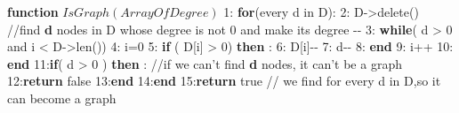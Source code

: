 \documentclass[10pt]{article}
\begin{document}
\noindent{}\textbf{function} $IsGraph(Array Of Degree)$\mdbr
{}1:  \textbf{for}(every d in D): \mdbr
{}2: \hspace*{1em} D-\textgreater{}delete() //find \textbf{d} nodes  in D whose degree is not 0 and make its degree --\mdbr
{}3: \hspace*{1em} \textbf{while}( d \textgreater{} 0 and i \textless{} D-\textgreater{}len()) \mdbr
{}4: \hspace*{1em}\hspace*{1em} i=0\mdbr
{}5: \hspace*{1em}\hspace*{1em} \textbf{if} ( D[i] \textgreater{} 0) \textbf{then} :\mdbr
{}6: \hspace*{1em}\hspace*{1em}\hspace*{1em} D[i]--\mdbr
{}7: \hspace*{1em}\hspace*{1em}\hspace*{1em} d--\mdbr
{}8: \hspace*{1em}\hspace*{1em} \textbf{end}\mdbr
{}9: \hspace*{1em}\hspace*{1em} i++\mdbr
{}10:\hspace*{1em} \textbf{end}\mdbr
{}11:\hspace*{1em}\textbf{if}( d \textgreater{} 0 ) \textbf{then} : //if we can't find \textbf{d} nodes, it can't be a graph \mdbr
{}12:\hspace*{1em}\hspace*{1em}\textbf{return}  false\mdbr
{}13:\hspace*{1em}\textbf{end}\mdbr
{}14:\textbf{end}\mdbr
{}15:\textbf{return} true // we find for every d in D,so it can become a graph %
\end{document}
